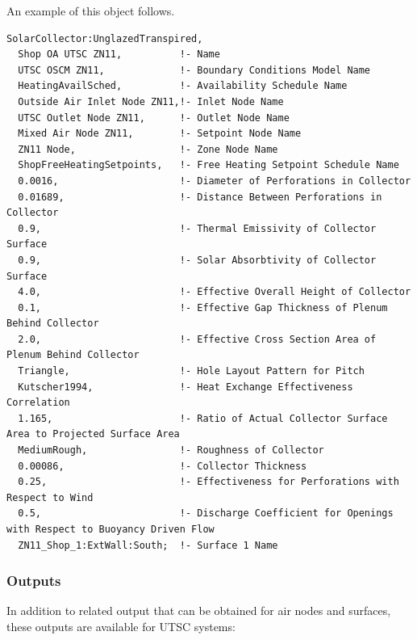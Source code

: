 An example of this object follows.

\begin{lstlisting}
SolarCollector:UnglazedTranspired,
  Shop OA UTSC ZN11,          !- Name
  UTSC OSCM ZN11,             !- Boundary Conditions Model Name
  HeatingAvailSched,          !- Availability Schedule Name
  Outside Air Inlet Node ZN11,!- Inlet Node Name
  UTSC Outlet Node ZN11,      !- Outlet Node Name
  Mixed Air Node ZN11,        !- Setpoint Node Name
  ZN11 Node,                  !- Zone Node Name
  ShopFreeHeatingSetpoints,   !- Free Heating Setpoint Schedule Name
  0.0016,                     !- Diameter of Perforations in Collector
  0.01689,                    !- Distance Between Perforations in Collector
  0.9,                        !- Thermal Emissivity of Collector Surface
  0.9,                        !- Solar Absorbtivity of Collector Surface
  4.0,                        !- Effective Overall Height of Collector
  0.1,                        !- Effective Gap Thickness of Plenum Behind Collector
  2.0,                        !- Effective Cross Section Area of Plenum Behind Collector
  Triangle,                   !- Hole Layout Pattern for Pitch
  Kutscher1994,               !- Heat Exchange Effectiveness Correlation
  1.165,                      !- Ratio of Actual Collector Surface Area to Projected Surface Area
  MediumRough,                !- Roughness of Collector
  0.00086,                    !- Collector Thickness
  0.25,                       !- Effectiveness for Perforations with Respect to Wind
  0.5,                        !- Discharge Coefficient for Openings with Respect to Buoyancy Driven Flow
  ZN11_Shop_1:ExtWall:South;  !- Surface 1 Name
\end{lstlisting}

\subsubsection{Outputs}\label{outputs-4-015}

In addition to related output that can be obtained for air nodes and surfaces, these outputs are available for UTSC systems:

